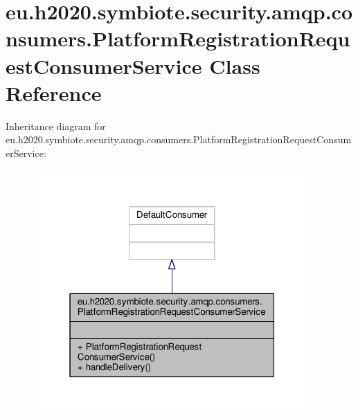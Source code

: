\hypertarget{classeu_1_1h2020_1_1symbiote_1_1security_1_1amqp_1_1consumers_1_1PlatformRegistrationRequestConsumerService}{}\section{eu.\+h2020.\+symbiote.\+security.\+amqp.\+consumers.\+Platform\+Registration\+Request\+Consumer\+Service Class Reference}
\label{classeu_1_1h2020_1_1symbiote_1_1security_1_1amqp_1_1consumers_1_1PlatformRegistrationRequestConsumerService}


Inheritance diagram for eu.\+h2020.\+symbiote.\+security.\+amqp.\+consumers.\+Platform\+Registration\+Request\+Consumer\+Service\+:
\nopagebreak
\begin{figure}[H]
\begin{center}
\leavevmode
\includegraphics[width=301pt]{classeu_1_1h2020_1_1symbiote_1_1security_1_1amqp_1_1consumers_1_1PlatformRegistrationRequestConsumerService__inherit__graph}
\end{center}
\end{figure}


